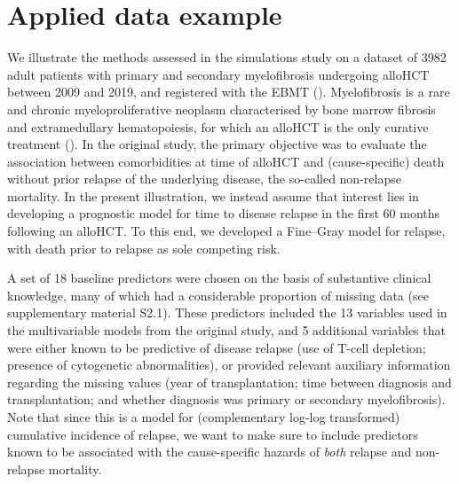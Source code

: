 \documentclass[
  letterpaper,
  DIV=11,
  numbers=noendperiod]{scrreprt}
\begin{document}
\section{Applied data example}\label{sec-polverelli}

We illustrate the methods assessed in the simulations study on a dataset
of 3982 adult patients with primary and secondary myelofibrosis
undergoing alloHCT between 2009 and 2019, and registered with the EBMT
(). Myelofibrosis is a rare and chronic
myeloproliferative neoplasm characterised by bone marrow fibrosis and
extramedullary hematopoiesis, for which an alloHCT is the only curative
treatment
(). In the original study, the primary objective was to
evaluate the association between comorbidities at time of alloHCT and
(cause-specific) death without prior relapse of the underlying disease,
the so-called non-relapse mortality. In the present illustration, we
instead assume that interest lies in developing a prognostic model for
time to disease relapse in the first 60 months following an alloHCT. To
this end, we developed a Fine--Gray model for relapse, with death prior
to relapse as sole competing risk.

A set of 18 baseline predictors were chosen on the basis of substantive
clinical knowledge, many of which had a considerable proportion of
missing data (see supplementary material S2.1). These predictors
included the 13 variables used in the multivariable models from the
original study, and 5 additional variables that were either known to be
predictive of disease relapse (use of T-cell depletion; presence of
cytogenetic abnormalities), or provided relevant auxiliary information
regarding the missing values (year of transplantation; time between
diagnosis and transplantation; and whether diagnosis was primary or
secondary myelofibrosis). Note that since this is a model for
(complementary log-log transformed) cumulative incidence of relapse, we
want to make sure to include predictors known to be associated with the
cause-specific hazards of \emph{both} relapse and non-relapse mortality.
\end{document}
